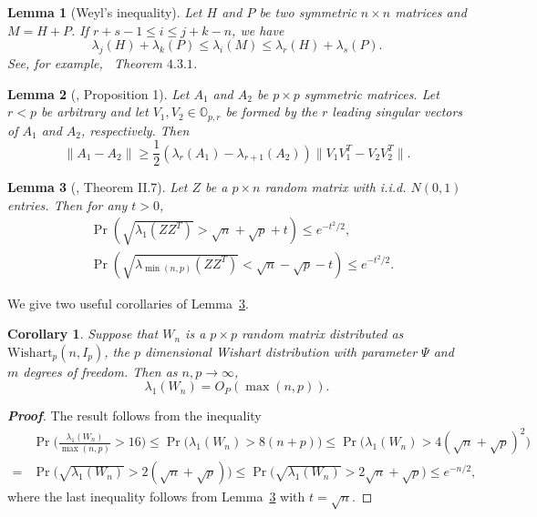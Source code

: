 \documentclass[review]{elsarticle}
\theoremstyle{plain}
\newtheorem{corollary}{\quad\quad Corollary}
\newtheorem{lemma}{\quad\quad Lemma}
\theoremstyle{definition}
\theoremstyle{remark}
\begin{document}
\begin{lemma}[Weyl's inequality]
Let $H$ and $P$ be two symmetric $n\times n$ matrices and $M=H+P$. If $r+s-1 \leq  i\leq j+k-n$, we have
\begin{equation*}
\lambda_j(H)+\lambda_k(P)\leq \lambda_i(M) \leq \lambda_r(H)+\lambda_s(P).
\end{equation*}
    See, for example,~\cite{Horn1985Matrix} Theorem $4.3.1$.
\end{lemma}

{\color{red}
\begin{lemma}[\cite{Cai2015Optimal}, Proposition 1]\label{pert}
    Let $A_1$ and $A_2$ be $p\times p$ symmetric matrices. Let $r<p$ be arbitrary and let $V_1, V_2\in \mathbb{O}_{p,r}$ be formed by the $r$ leading singular vectors of $A_1$ and $A_2$, respectively. Then
    $$
    \|A_1-A_2\|\geq \frac{1}{2}(\lambda_r(A_1)-\lambda_{r+1}(A_2))\|V_1 V_1^T- V_2 V_2^T\|.
    $$
\end{lemma}
}




{\color{red}
    \begin{lemma}[\cite{DAVIDSON2001317}, Theorem II.7]\label{DSbound}
        Let $Z$ be a $p\times n$ random matrix with i.i.d. $N(0,1)$ entries.
        Then for any $t>0$,
        \begin{align*}
            &\Pr(\sqrt{\lambda_1(Z Z^T )}>\sqrt{n}+\sqrt{p}+t)\leq e^{-t^2/2},
            \\
            &\Pr(\sqrt{\lambda_{\min(n,p)}(Z Z^T )}<\sqrt{n}-\sqrt{p}-t)\leq e^{-t^2/2}.
        \end{align*}
    \end{lemma}
    We give two useful corollaries of Lemma~\ref{DSbound}.
}
\begin{corollary}\label{maxEigen}
    Suppose that $W_n$ is a $p \times p$ random matrix distributed as $\mathrm{Wishart}_p(n,I_{p})$, the $p$ dimensional Wishart distribution with parameter $\Psi$ and $m$ degrees of freedom. Then as $n,p\to \infty$,
    $$
        \lambda_1(W_n)=O_P(\max(n,p)).
    $$
\end{corollary}
{\color{red}
\begin{proof}[\textbf{Proof}]
    The result follows from the inequality
    $$
    \begin{aligned}
        &\Pr\Big(\frac{\lambda_1(W_n)}{\max(n,p)}>16\Big)
        \leq
        \Pr\Big(\lambda_1(W_n)>8(n+p)\Big)
        \leq
        \Pr\Big(\lambda_1(W_n)>4(\sqrt{n}+\sqrt{p})^2\Big)\\
        =
        &\Pr\Big(\sqrt{\lambda_1(W_n)}>2(\sqrt{n}+\sqrt{p})\Big)
        \leq
        \Pr\Big(\sqrt{\lambda_1(W_n)}>2\sqrt{n}+\sqrt{p}\Big)\leq e^{-n/2},
    \end{aligned}
    $$
    where the last inequality follows from Lemma~\ref{DSbound} with $t=\sqrt{n}$.
\end{proof}
}
\end{document}
